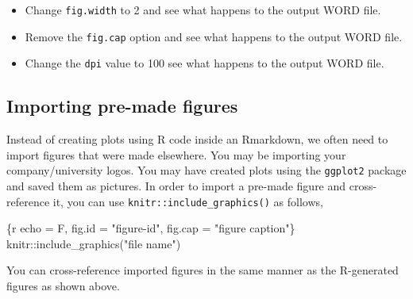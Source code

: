 \documentclass[
  letterpaper,
  DIV=11,
  numbers=noendperiod]{scrreprt}
\newenvironment{Shaded}{\begin{snugshade}}{\end{snugshade}}
\newcommand{\NormalTok}[1]{\textcolor[rgb]{0.00,0.23,0.31}{#1}}
\providecommand{\tightlist}{%
  \setlength{\itemsep}{0pt}\setlength{\parskip}{0pt}}\usepackage{longtable,booktabs,array}
\begin{document}
\begin{tcolorbox}[enhanced jigsaw, colframe=quarto-callout-note-color-frame, toptitle=1mm, colbacktitle=quarto-callout-note-color!10!white, toprule=.15mm, colback=white, arc=.35mm, bottomtitle=1mm, opacitybacktitle=0.6, breakable, left=2mm, coltitle=black, leftrule=.75mm, title=\textcolor{quarto-callout-note-color}{\faInfo}\hspace{0.5em}{Try}, rightrule=.15mm, titlerule=0mm, opacityback=0, bottomrule=.15mm]

\begin{itemize}
\tightlist
\item
  Change \texttt{fig.width} to 2 and see what happens to the output WORD
  file.
\item
  Remove the \texttt{fig.cap} option and see what happens to the output
  WORD file.
\item
  Change the \texttt{dpi} value to 100 see what happens to the output
  WORD file.
\end{itemize}

\end{tcolorbox}

\hypertarget{importing-pre-made-figures}{%
\subsection{Importing pre-made
figures}\label{importing-pre-made-figures}}

Instead of creating plots using R code inside an Rmarkdown, we often
need to import figures that were made elsewhere. You may be importing
your company/university logos. You may have created plots using the
\texttt{ggplot2} package and saved them as pictures. In order to import
a pre-made figure and cross-reference it, you can use
\texttt{knitr::include\_graphics()} as follows,

\begin{Shaded}
\begin{Highlighting}[]
\NormalTok{\textasciigrave{}\textasciigrave{}\textasciigrave{}\{r  echo = F, fig.id = "figure{-}id", fig.cap = "figure caption"\}}
\NormalTok{knitr::include\_graphics("file name")}
\NormalTok{\textasciigrave{}\textasciigrave{}\textasciigrave{}}
\end{Highlighting}
\end{Shaded}

You can cross-reference imported figures in the same manner as the
R-generated figures as shown above.
\end{document}

